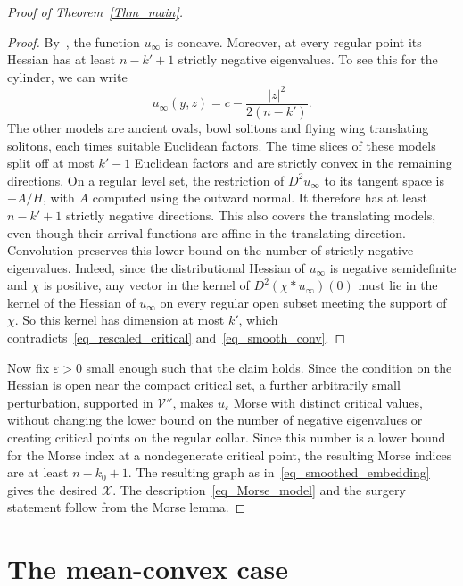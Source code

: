\documentclass[12pt,twoside,reqno]{amsart}
\newcommand{\VV}{\mathcal{V}}
\newcommand{\XX}{\mathcal{X}}
\newcommand{\eps}{\varepsilon}
\theoremstyle{definition}
\theoremstyle{remark}
\numberwithin{equation}{section}
\begin{document}
\begin{proof}[Proof of Theorem~\ref{Thm_main}]
\begin{proof}
By~\cite[Proposition~3.2]{BourniLangfordLynch}, the function $u_\infty$ is concave.
Moreover, at every regular point its Hessian has at least $n-k'+1$ strictly negative eigenvalues.
To see this for the cylinder, we can write
\[
 u_\infty(y,z)=c-\frac{|z|^2}{2(n-k')}.
\]
The other models are ancient ovals, bowl solitons and flying wing translating solitons, each times suitable Euclidean factors.
The time slices of these models split off at most $k'-1$ Euclidean factors and are strictly convex in the remaining directions.
On a regular level set, the restriction of $D^2u_\infty$ to its tangent space is $-A/H$, with $A$ computed using the outward normal.
It therefore has at least $n-k'+1$ strictly negative directions.
This also covers the translating models, even though their arrival functions are affine in the translating direction.
Convolution preserves this lower bound on the number of strictly negative eigenvalues.
Indeed, since the distributional Hessian of $u_\infty$ is negative semidefinite and $\chi$ is positive, any vector in the kernel of $D^2(\chi*u_\infty)(0)$ must lie in the kernel of the Hessian of $u_\infty$ on every regular open subset meeting the support of $\chi$.
So this kernel has dimension at most $k'$, which contradicts~\eqref{eq_rescaled_critical} and~\eqref{eq_smooth_conv}.
\end{proof}

Now fix $\eps>0$ small enough such that the claim holds.
Since the condition on the Hessian is open near the compact critical set, a further arbitrarily small perturbation, supported in $\VV''$, makes $u_\eps$ Morse with distinct critical values, without changing the lower bound on the number of negative eigenvalues or creating critical points on the regular collar.
Since this number is a lower bound for the Morse index at a nondegenerate critical point, the resulting Morse indices are at least $n-k_0+1$.
The resulting graph as in~\eqref{eq_smoothed_embedding} gives the desired $\XX$.
The description~\eqref{eq_Morse_model} and the surgery statement follow from the Morse lemma.
\end{proof}


\section{The mean-convex case}
\end{document}
